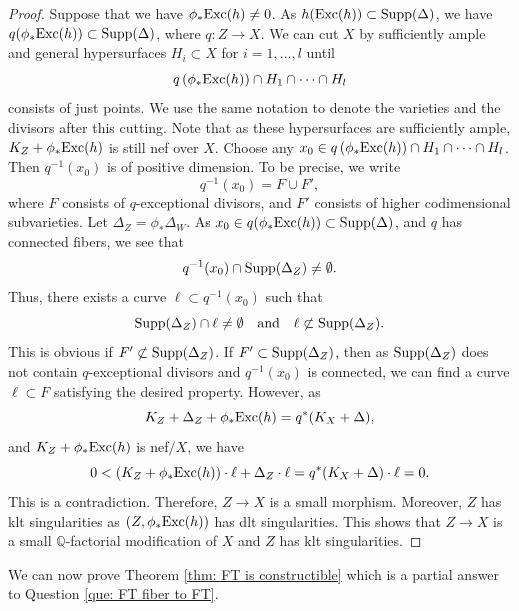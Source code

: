 \documentclass[11pt,oneside,reqno]{amsart}
\numberwithin{equation}{section}
\theoremstyle{definition}
\newcommand{\Exc}{{\rm {Exc}}}
\newcommand{\Supp}{{\rm {Supp}}}
\newcommand{\bQ}{\mathbb{Q}}
\begin{document}
\begin{proof}
Suppose that we have $\phi_*\Exc(h) \neq 0$. As $h(\Exc(h))\subset  \Supp(\Delta)$, we have $q(\phi_*\Exc(h)) \subset \Supp(\Delta)$, where $q: Z \to X$. We can cut $X$ by sufficiently ample and general hypersurfaces $H_i \subset X$ for $i=1,\ldots,l$ until 
\[
q\left(\phi_*\Exc(h)\right) \cap H_1\cap \cdots \cap H_l
\] consists of just points. We use the same notation to denote the varieties and the divisors after this cutting. Note that as these hypersurfaces are sufficiently ample, $K_Z+\phi_*\Exc(h)$ is still nef over $X$. Choose any $x_0 \in q\left(\phi_*\Exc(h)\right) \cap H_1\cap \cdots \cap H_l$. Then $q^{-1}(x_0)$ is of positive dimension. To be precise, we write 
\[
q^{-1}(x_0) = F \cup F',
\] where $F$ consists of $q$-exceptional divisors, and $F'$ consists of higher codimensional subvarieties. Let $\Delta_Z = \phi_*\Delta_W$. As $x_0 \in q(\phi_*\Exc(h)) \subset \Supp(\Delta)$, and $q$ has connected fibers, we see that 
\[
q^{-1}(x_0) \cap \Supp(\Delta_Z) \neq \emptyset.
\] Thus, there exists a curve $\ell \subset q^{-1}(x_0)$ such that 
\[
\Supp(\Delta_Z) \cap \ell \neq \emptyset \quad\text{and} \quad \ell \not\subset \Supp(\Delta_Z).
\] This is obvious if $F' \not\subset \Supp(\Delta_Z)$. If $F' \subset \Supp(\Delta_Z)$, then as $\Supp(\Delta_Z)$ does not contain $q$-exceptional divisors and $q^{-1}(x_0)$ is connected, we can find a curve $\ell \subset F$ satisfying the desired property. However, as
\[
K_Z+\Delta_Z+\phi_*\Exc(h)=q^*(K_X+\Delta),
\] and $K_Z+\phi_*\Exc(h)$ is nef$/X$, we have
\[
0<(K_Z +\phi_*\Exc(h))\cdot \ell+\Delta_Z \cdot \ell = q^*(K_X+\Delta) \cdot \ell =0.
\] This is a contradiction. Therefore, $Z \to X$ is a small morphism. Moreover, $Z$ has klt singularities as $(Z, \phi_*\Exc(h))$ has dlt singularities. This shows that $Z \to X$ is a small $\bQ$-factorial modification of $X$ and $Z$ has klt singularities. 
\end{proof}

We can now prove Theorem \ref{thm: FT is constructible} which is a partial answer to Question \ref{que: FT fiber to FT}. 
\end{document}
